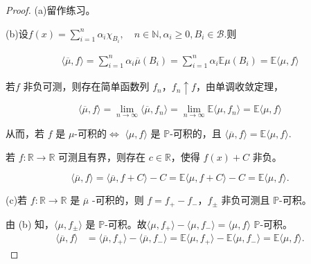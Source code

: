 \begin{proof}
    (a)留作练习。

    (b)设$f(x)=\sum\limits_{i=1}^n\alpha_i\chi_{B_i},\quad n\in \mathbb{N},\alpha_i\ge 0,B_i\in \mathcal{B}$.则

\begin{equation*}
\begin{aligned}
\langle \overline{\mu}, f \rangle = \sum_{i=1}^{n} \alpha_i \overline{\mu}(B_i) = \sum_{i=1}^{n} \alpha_i \mathbb{E} \mu(B_i)
    = \mathbb{E} \langle \mu, f \rangle
\end{aligned}
\end{equation*}


若\(f\) 非负可测，则存在简单函数列 \(f_n\)，\(f_n \uparrow f\)，由单调收敛定理，

\begin{equation*}
\langle \overline{\mu}, f \rangle = \lim_{n \to \infty} \langle \overline{\mu}, f_n \rangle = \lim_{n \to \infty} \mathbb{E} \langle \mu, f_n \rangle = \mathbb{E} \langle\mu, f \rangle
\end{equation*}



从而，若 \(f\) 是 \(\mu\)-可积的$\iff$ \(\langle \mu, f \rangle\) 是 \(\mathbb{P}\)-可积的，且
$\langle \overline{\mu}, f \rangle = \mathbb{E} \langle {\mu}, f \rangle$.


若 \(f: \mathbb{R} \to \mathbb{R}\) 可测且有界，则存在 \(c \in \mathbb{R}\)，使得 \(f(x) + C\) 非负。

\begin{equation*}
\langle \overline{\mu}, f \rangle = \langle \overline{\mu}, f+C \rangle - C = \mathbb{E} \langle \mu, f+C \rangle - C =\mathbb{E}\langle \mu, f \rangle.
\end{equation*}

(c)若 \(f : \mathbb{R} \to \mathbb{R}\) 是 $\overline{\mu}$ -可积的，则 \(f = f_+ - f_-\)，\(f_\pm\) 非负可测且 \(\mathbb{P}\)-可积。

由 (b) 知，\(\langle \mu, f_\pm \rangle\) 是 \(\mathbb{P}\)-可积。故\(\langle \mu, f_+ \rangle - \langle \mu, f_- \rangle = \langle \mu, f \rangle\) \(\mathbb{P}\)-可积。
\begin{equation*}
\begin{aligned}
    \langle \overline{\mu}, f \rangle &= \langle \overline{\mu}, f_+ \rangle - \langle \overline{\mu}, f_- \rangle
= \mathbb{E} \langle {\mu}, f_+ \rangle - \mathbb{E} \langle\mu, f_- \rangle
=  \mathbb{E} \langle {\mu}, f \rangle.
\end{aligned}
\end{equation*}
\end{proof}

